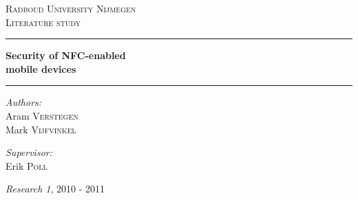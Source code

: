 \begin{titlepage}
\begin{center}
\textsc{\LARGE Radboud University Nijmegen}\\[1.5cm]
\textsc{\Large Literature study}\\[1.5cm]
\hrule \vspace{0.4cm}
{\huge \bfseries Security of NFC-enabled \\ mobile devices } \\[0.4cm]
\hrule \vspace{1.5cm}

\vspace{2.5cm}
\begin{minipage}{0.4\textwidth}
\begin{flushleft} \large
\emph{Authors:}\\
Aram \textsc{Verstegen} \\
Mark \textsc{Vijfvinkel}
\end{flushleft}
\end{minipage}
\begin{minipage}{0.4\textwidth}
\begin{flushright} \large
\emph{Supervisor:} \\
Erik \textsc{Poll} \\
\vspace{0.57cm}
\end{flushright}
\end{minipage}

 
\vfill

\emph{Research 1}, 2010 - 2011 \\

\end{center}
\end{titlepage}
